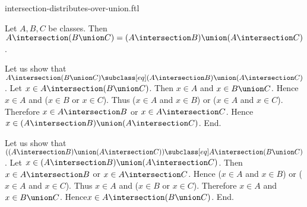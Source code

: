 \documentclass{article}
\begin{document}
\begin{smodule}[creators={Marcel Schütz}]{intersection-distributes-over-union.ftl}

  \begin{fproposition*}[label=3102749514268672]
    Let $A, B, C$ be classes.
    Then $A \intersection (B \union C) = (A \intersection B) \union (A \intersection C)$.
  \end{fproposition*}
  \begin{fproof}
    Let us show that $A \intersection (B \union C) \subclass[eq] (A \intersection B) \union (A \intersection C)$.
      Let $x \in A \intersection (B \union C)$.
      Then $x \in A$ and $x \in B \union C$.
      Hence $x \in A$ and ($x \in B$ or $x \in C$).
      Thus ($x \in A$ and $x \in B$) or ($x \in A$ and $x \in C$).
      Therefore $x \in A \intersection B$ or $x \in A \intersection C$.
      Hence $x \in (A \intersection B) \union (A \intersection C)$.
    End.

    Let us show that $((A \intersection B) \union (A \intersection C)) \subclass[eq] A \intersection (B \union C)$. %
      Let $x \in (A \intersection B) \union (A \intersection C)$.
      Then $x \in A \intersection B$ or $x \in A \intersection C$.
      Hence ($x \in A$ and $x \in B$) or ($x \in A$ and $x \in C$).
      Thus $x \in A$ and ($x \in B$ or $x \in C$).
      Therefore $x \in A$ and $x \in B \union C$.
      Hence$ x \in A \intersection (B \union C)$.
    End.
  \end{fproof}
\end{smodule}
\end{document}
